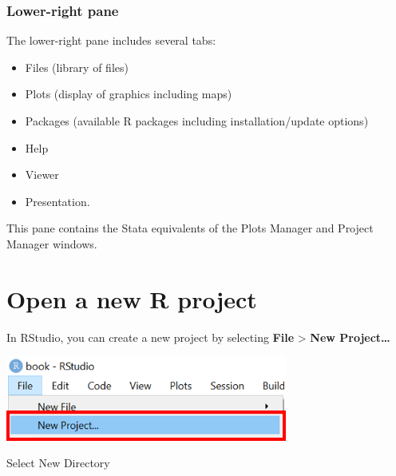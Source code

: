 \documentclass[
  letterpaper,
  DIV=11,
  numbers=noendperiod,
  oneside]{scrreprt}
\providecommand{\tightlist}{%
  \setlength{\itemsep}{0pt}\setlength{\parskip}{0pt}}\usepackage{longtable,booktabs,array}
\begin{document}
\hypertarget{lower-right-pane}{%
\subsubsection{Lower-right pane}\label{lower-right-pane}}

The lower-right pane includes several tabs:

\begin{itemize}
\tightlist
\item
  Files (library of files)
\item
  Plots (display of graphics including maps)
\item
  Packages (available R packages including installation/update options)
\item
  Help
\item
  Viewer
\item
  Presentation.
\end{itemize}

\begin{tcolorbox}[enhanced jigsaw, colbacktitle=quarto-callout-tip-color!10!white, titlerule=0mm, breakable, opacityback=0, opacitybacktitle=0.6, left=2mm, coltitle=black, colback=white, title=\textcolor{quarto-callout-tip-color}{\faLightbulb}\hspace{0.5em}{Tip}, rightrule=.15mm, colframe=quarto-callout-tip-color-frame, toprule=.15mm, bottomtitle=1mm, toptitle=1mm, arc=.35mm, bottomrule=.15mm, leftrule=.75mm]
This pane contains the Stata equivalents of the Plots Manager and
Project Manager windows.
\end{tcolorbox}

\hypertarget{open-a-new-r-project}{%
\section{Open a new R project}\label{open-a-new-r-project}}

In RStudio, you can create a new project by selecting \textbf{File}
\textgreater{} \textbf{New Project\ldots{}}

\includegraphics[width=3.64583in,height=\textheight]{./images/paste-CCA1D5A5.png}

Select New Directory
\end{document}

